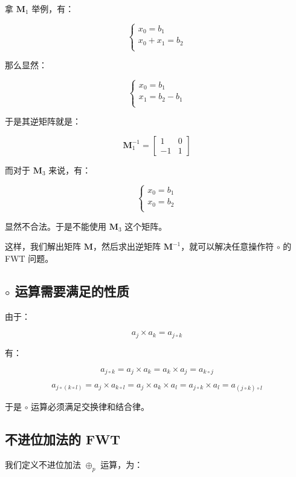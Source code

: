 \documentclass{article}
\begin{document}
拿 $\mathbf{M}_1$ 举例，有：

$$
\begin{cases}
    x_0 = b_1 \\
    x_0 + x_1 =b_2 \\
\end{cases}
$$

那么显然：

$$
\begin{cases}
    x_0 = b_1 \\
    x_1 = b_2-b_1 \\
\end{cases}
$$

于是其逆矩阵就是：

$$\mathbf{M}_1^{-1}=\begin{bmatrix} 1 & 0 \\ -1 & 1 \end{bmatrix}$$

而对于 $\mathbf{M}_3$ 来说，有：

$$
\begin{cases}
    x_0 = b_1 \\
    x_0 = b_2 \\
\end{cases}
$$

显然不合法。于是不能使用 $\mathbf{M}_3$ 这个矩阵。

这样，我们解出矩阵 $\mathbf{M}$，然后求出逆矩阵 $\mathbf{M}^{-1}$，就可以解决任意操作符 $\circ$ 的 FWT 问题。

\subsection{$\circ$ 运算需要满足的性质}

由于：

$$a_{j} \times a_{k}=a_{j \circ k}$$

有：

$$
a_{j \circ k}=a_j \times a_k=a_k \times a_j=a_{k \circ j}
$$

$$
a_{j \circ (k \circ l)}=a_j \times a_{k \circ l}=a_j \times a_k \times a_l=a_{j \circ k} \times a_{l}=a_{(j \circ k)\circ l}
$$

于是 $\circ$ 运算必须满足交换律和结合律。

\subsection{不进位加法的 FWT}

我们定义不进位加法 $\oplus_p$ 运算，为：
\end{document}
